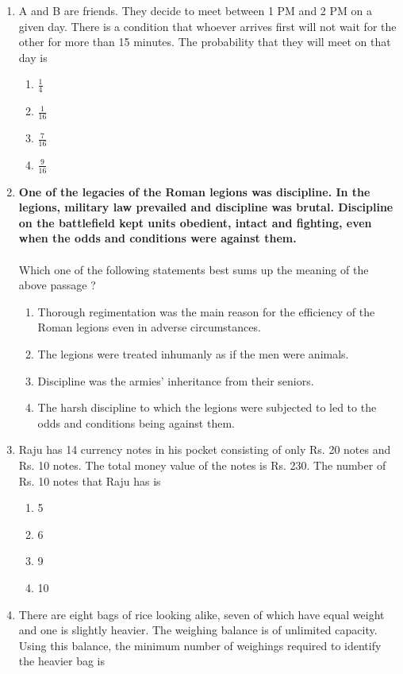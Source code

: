 \documentclass[journal]{IEEEtran}
\begin{document}
\begin{enumerate}
\begin{enumerate}
 \end{enumerate}
\item A and B are friends. They decide to meet between 1 PM and 2 PM on a given day. There is a condition that whoever arrives first will not wait for the other for more than 15 minutes. The probability that they will meet on that day is
\begin{enumerate}
     \item $\frac{1}{4}$
     \item $\frac{1}{16}$
     \item $\frac{7}{16}$
     \item $\frac{9}{16}$ \\
 \end{enumerate}
\item \textbf{One of the legacies of the Roman legions was discipline. In the legions, military law prevailed and discipline was brutal. Discipline on the battlefield kept units obedient, intact and fighting, even when the odds and conditions were against them.}\\\\
Which one of the following statements best sums up the meaning of the above passage ?
\begin{enumerate}
    \item Thorough regimentation was the main reason for the efficiency of the Roman legions even in adverse circumstances. 
    \item The legions were treated inhumanly as if the men were animals.
    \item Discipline was the armies' inheritance from their seniors.
    \item The harsh discipline to which the legions were subjected to led to the odds and conditions being against them. \\
\end{enumerate}
\item Raju has 14 currency notes in his pocket consisting of only Rs. 20 notes and Rs. 10 notes. The total money value of the notes is Rs. 230. The number of Rs. 10 notes that Raju has is
\begin{enumerate}
    \item 5
    \item 6
    \item 9
    \item 10 \\
\end{enumerate}
\item There are eight bags of rice looking alike, seven of which have equal weight and one is slightly heavier. The weighing balance is of unlimited capacity. Using this balance, the minimum number of weighings required to identify the heavier bag is

\end{enumerate}
\end{document}

